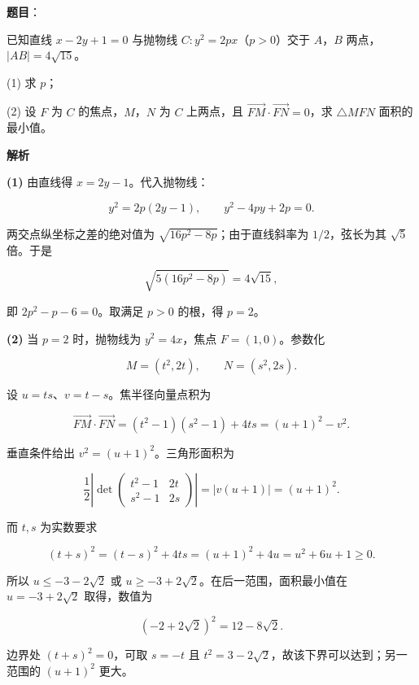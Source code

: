 \begin{answer}

\textbf{题目}：

已知直线 $x-2y+1=0$ 与抛物线 $C:y^2=2px$（$p>0$）交于 $A$，$B$ 两点，$|AB|=4\sqrt{15}$。

  (1) 求 $p$；

  (2) 设 $F$ 为 $C$ 的焦点，$M$，$N$ 为 $C$ 上两点，且 $\overrightarrow{FM}\cdot\overrightarrow{FN}=0$，求 $\triangle MFN$ 面积的最小值。

\textbf{解析}

\textbf{(1)} 由直线得 $x=2y-1$。代入抛物线：

\nopagebreak[4]
\[
y^2=2p(2y-1),\qquad y^2-4py+2p=0.
\]

两交点纵坐标之差的绝对值为 $\sqrt{16p^2-8p}$；由于直线斜率为 $1/2$，弦长为其 $\sqrt5$ 倍。于是

\nopagebreak[4]
\[
\sqrt{5(16p^2-8p)}=4\sqrt{15},
\]

即 $2p^2-p-6=0$。取满足 $p>0$ 的根，得 $p=2$。

\textbf{(2)} 当 $p=2$ 时，抛物线为 $y^2=4x$，焦点 $F=(1,0)$。参数化

\nopagebreak[4]
\[
M=(t^2,2t),\qquad N=(s^2,2s).
\]

设 $u=ts$、$v=t-s$。焦半径向量点积为

\nopagebreak[4]
\[
\overrightarrow{FM}\cdot\overrightarrow{FN}
=(t^2-1)(s^2-1)+4ts
=(u+1)^2-v^2.
\]

垂直条件给出 $v^2=(u+1)^2$。三角形面积为

\nopagebreak[4]
\[
\frac12\left|\det
\begin{pmatrix}
t^2-1&2t\\
s^2-1&2s
\end{pmatrix}\right|
=|v(u+1)|=(u+1)^2.
\]

而 $t,s$ 为实数要求

\nopagebreak[4]
\[
(t+s)^2=(t-s)^2+4ts=(u+1)^2+4u=u^2+6u+1\geqslant0.
\]

所以 $u\leqslant-3-2\sqrt2$ 或 $u\geqslant-3+2\sqrt2$。在后一范围，面积最小值在 $u=-3+2\sqrt2$ 取得，数值为

\nopagebreak[4]
\[
(-2+2\sqrt2)^2=12-8\sqrt2.
\]


边界处 $(t+s)^2=0$，可取 $s=-t$ 且 $t^2=3-2\sqrt2$，故该下界可以达到；另一范围的 $(u+1)^2$ 更大。



\end{answer}
